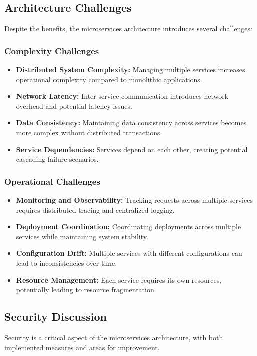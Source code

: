 \documentclass[conference]{IEEEtran}
\begin{document}
\subsection{Architecture Challenges}
Despite the benefits, the microservices architecture introduces several challenges:

\subsubsection{Complexity Challenges}
\begin{itemize}
  \item \textbf{Distributed System Complexity:} Managing multiple services increases operational complexity compared to monolithic applications.
  \item \textbf{Network Latency:} Inter-service communication introduces network overhead and potential latency issues.
  \item \textbf{Data Consistency:} Maintaining data consistency across services becomes more complex without distributed transactions.
  \item \textbf{Service Dependencies:} Services depend on each other, creating potential cascading failure scenarios.
\end{itemize}

\subsubsection{Operational Challenges}
\begin{itemize}
  \item \textbf{Monitoring and Observability:} Tracking requests across multiple services requires distributed tracing and centralized logging.
  \item \textbf{Deployment Coordination:} Coordinating deployments across multiple services while maintaining system stability.
  \item \textbf{Configuration Drift:} Multiple services with different configurations can lead to inconsistencies over time.
  \item \textbf{Resource Management:} Each service requires its own resources, potentially leading to resource fragmentation.
\end{itemize}

\subsection{Security Discussion}
Security is a critical aspect of the microservices architecture, with both implemented measures and areas for improvement.
\end{document}
